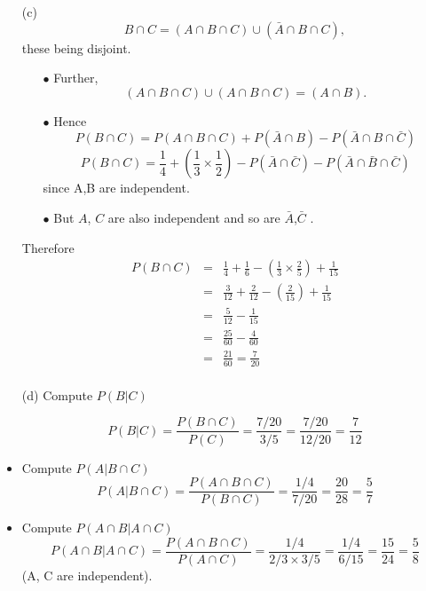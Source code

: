 \documentclass[a4paper,12pt]{article}
\begin{document}
\begin{itemize}
\item[(c)]  \[B\cap C = (A\cap B\cap C)\cup(\bar{A} \cap B\cap C), \] these being disjoint.
\begin{itemize}
\item[$\bullet$] Further, \[(A\cap B \cap C)\cup(A\cap B \cap C) = (A\cap B) .\]
\item[$\bullet$] Hence \[P(B \cap C) = P(A\cap B \cap C) + P(\bar{A} \cap B) - P(\bar{A} \cap B \cap \bar{C})\]
\[P(B \cap C) =  \frac{1}{4}+ \left( \frac{1}{3} \times \frac{1}{2} \right) 
- P (\bar{A} \cap \bar{C} ) - P (\bar{A} \cap \bar{B} \cap \bar{C}) \]
since A,B are independent.

\item[$\bullet$] But $A$, $C$ are also independent and so are $\bar{A}$,$\bar{C}$ .
\end{itemize}

Therefore 
\begin{eqnarray*}
P( B \cap C)  &=& \frac{1}{4} +\frac{1}{6} -\left( \frac{1}{3} \times \frac{2}{5} \right) + \frac{1}{15} \\
&=& \frac{3}{12} +\frac{2}{12} -\left(  \frac{2}{15} \right) + \frac{1}{15}
\\
&=& \frac{5}{12} -\frac{1}{15}\\
&=& \frac{25}{60} -\frac{4}{60}\\
&=& \frac{21}{60} = \frac{7}{20}\\
\end{eqnarray*}

\end{itemize}


\begin{itemize}
\item[(d)] Compute $P (B | C)$

\[
P (B | C) = \frac{P( B \cap C)}{P (C)} = \frac{7/20}{3/5} = \frac{7/20}{12/20} = \frac{7}{12}\]

\item Compute $P (A | B  \cap C)$ 
\[
P (A | B  \cap C) = \frac{P( A \cap B \cap C)}{P (B \cap C)} = \frac{1/4}{7/20} = \frac{20}{28} = \frac{5}{7}\]

\item Compute $P (A \cap B | A \cap C)$ 
\[
P (A \cap B | A \cap C) = \frac{P( A \cap B \cap C)}{P (A \cap C)} = \frac{1/4}{2/3 \times 3/5} = \frac{1/4}{6/15} = \frac{15}{24} = \frac{5}{8}\]
(A, C are independent).
\end{itemize}
\end{document}
